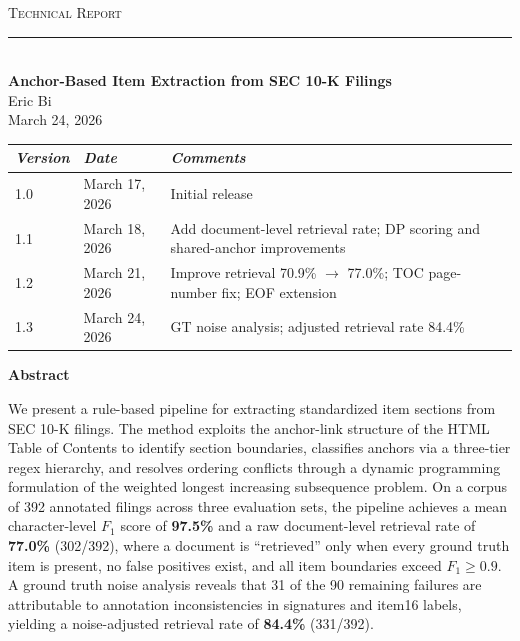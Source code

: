 \documentclass[11pt,a4paper]{article}
\begin{document}
\begin{center}
{\small\scshape Technical Report}\\[2pt]
\rule{\textwidth}{0.5pt}\\[12pt]
{\LARGE\bfseries Anchor-Based Item Extraction from SEC 10-K Filings}\\[12pt]
Eric Bi\\
March 24, 2026\\[8pt]
\end{center}

\vspace{4pt}
\noindent
\begin{tabular}{@{}lll@{}}
\toprule
\textit{Version} & \textit{Date} & \textit{Comments}\\
\midrule
1.0 & March 17, 2026 & Initial release\\
1.1 & March 18, 2026 & Add document-level retrieval rate; DP scoring and shared-anchor improvements\\
1.2 & March 21, 2026 & Improve retrieval 70.9\% $\to$ 77.0\%; TOC page-number fix; EOF extension\\
1.3 & March 24, 2026 & GT noise analysis; adjusted retrieval rate 84.4\%\\
\bottomrule
\end{tabular}

\vspace{12pt}
\begin{center}\textbf{Abstract}\end{center}

\noindent
We present a rule-based pipeline for extracting standardized item sections from SEC 10-K filings. The method exploits the anchor-link structure of the HTML Table of Contents to identify section boundaries, classifies anchors via a three-tier regex hierarchy, and resolves ordering conflicts through a dynamic programming formulation of the weighted longest increasing subsequence problem. On a corpus of 392 annotated filings across three evaluation sets, the pipeline achieves a mean character-level $F_1$ score of \textbf{97.5\%} and a raw document-level retrieval rate of \textbf{77.0\%} (302/392), where a document is ``retrieved'' only when every ground truth item is present, no false positives exist, and all item boundaries exceed $F_1 \geq 0.9$. A ground truth noise analysis reveals that 31 of the 90 remaining failures are attributable to annotation inconsistencies in signatures and item16 labels, yielding a noise-adjusted retrieval rate of \textbf{84.4\%} (331/392).
\end{document}
